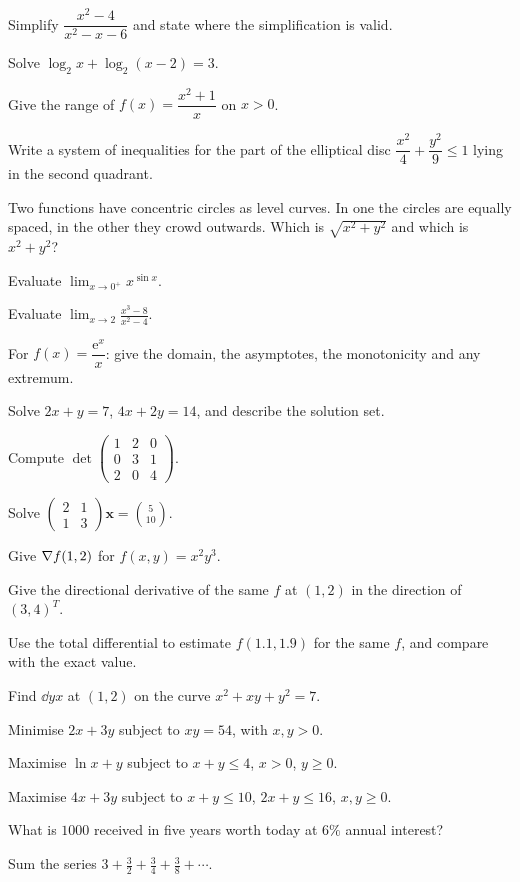 \begin{problems}
  \item Simplify $\dfrac{x^{2}-4}{x^{2}-x-6}$ and state where the
        simplification is valid.
  \item Solve $\log_{2}x+\log_{2}(x-2)=3$.
  \item Give the range of $f(x)=\dfrac{x^{2}+1}{x}$ on $x>0$.
  \item Write a system of inequalities for the part of the elliptical disc
        $\dfrac{x^{2}}{4}+\dfrac{y^{2}}{9}\le1$ lying in the second
        quadrant.
  \item Two functions have concentric circles as level curves. In one the
        circles are equally spaced, in the other they crowd outwards. Which
        is $\sqrt{x^{2}+y^{2}}$ and which is $x^{2}+y^{2}$?
  \item Evaluate $\displaystyle\lim_{x\to0^{+}}x^{\sin x}$.
  \item Evaluate $\displaystyle\lim_{x\to2}\frac{x^{3}-8}{x^{2}-4}$.
  \item For $f(x)=\dfrac{\mathrm{e}^{x}}{x}$: give the domain, the
        asymptotes, the monotonicity and any extremum.
  \item Solve $2x+y=7$, \;$4x+2y=14$, and describe the solution set.
  \item Compute
        $\det\begin{pmatrix}1&2&0\\0&3&1\\2&0&4\end{pmatrix}$.
  \item Solve $\begin{pmatrix}2&1\\1&3\end{pmatrix}
        \mathbf{x}=\binom{5}{10}$.
  \item Give $\nabla f(1,2)$ for $f(x,y)=x^{2}y^{3}$.
  \item Give the directional derivative of the same $f$ at $(1,2)$ in the
        direction of $(3,4)^{T}$.
  \item Use the total differential to estimate $f(1.1,1.9)$ for the same
        $f$, and compare with the exact value.
  \item Find $\dd{y}{x}$ at $(1,2)$ on the curve $x^{2}+xy+y^{2}=7$.
  \item Minimise $2x+3y$ subject to $xy=54$, with $x,y>0$.
  \item Maximise $\ln x+y$ subject to $x+y\le4$, $x>0$, $y\ge0$.
  \item Maximise $4x+3y$ subject to $x+y\le10$, $2x+y\le16$, $x,y\ge0$.
  \item What is $1000$ received in five years worth today at $6\%$ annual
        interest?
  \item Sum the series $3+\tfrac32+\tfrac34+\tfrac38+\cdots$.
\end{problems}


